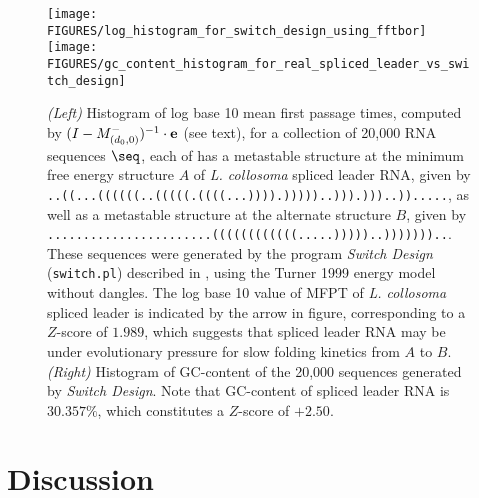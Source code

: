 \begin{figure}[!tbph]
\begin{center}
\texttt{[image: FIGURES/log\_histogram\_for\_switch\_design\_using\_fftbor]}
\texttt{[image: FIGURES/gc\_content\_histogram\_for\_real\_spliced\_leader\_vs\_switch\_design]}
\caption{\small
{\em (Left)}
Histogram of log base 10 mean first passage times,
computed by $(I - M^{-}_{(d_0,0)})^{-1} \cdot {\bf e}$ (see text),
for a collection of 20,000 RNA sequences $\seq$, each of has a metastable
structure at the minimum free energy structure $A$ of
{\em L. collosoma} spliced leader RNA, given by
{\tiny \tt ..((...((((((..(((((.((((...)))).)))))..))).)))..)).....},
as well as a metastable structure at the alternate structure $B$,
given by
{\tiny \tt .......................((((((((((((.....)))))..)))))))..}.
These sequences were generated by the program {\em Switch Design}
({\tt switch.pl}) described in \cite{Flamm.r01}, using the Turner 1999
energy model without dangles.
The log base 10 value of MFPT of {\em L. collosoma} spliced leader
is indicated by the arrow in figure, corresponding to a $Z$-score of
$1.989$, which suggests
that spliced leader RNA may be under evolutionary pressure
for slow folding kinetics from $A$ to $B$.
{\em (Right)} Histogram of GC-content of the 20,000 sequences generated
by {\em Switch Design}. Note that GC-content of spliced leader RNA is
$30.357\%$, which constitutes a $Z$-score of
$+2.50$.
}
\end{center}
\label{fig:histogramMFPT}
\end{figure}



\section{Discussion}
\label{section:discussion}

